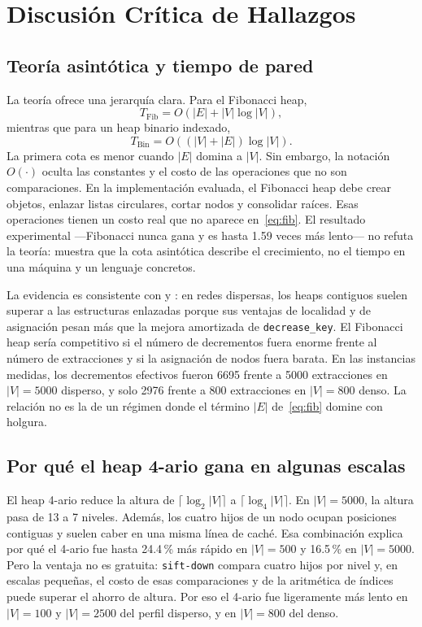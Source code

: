 \section{Discusión Crítica de Hallazgos}
\label{sec:discusion}

\subsection{Teoría asintótica y tiempo de pared}
La teoría ofrece una jerarquía clara. Para el Fibonacci heap,
\begin{equation}
    T_{\text{Fib}}=O(|E|+|V|\log|V|),
    \label{eq:fib}
\end{equation}
mientras que para un heap binario indexado,
\begin{equation}
    T_{\text{Bin}}=O((|V|+|E|)\log|V|).
    \label{eq:bin}
\end{equation}
La primera cota es menor cuando $|E|$ domina a $|V|$. Sin embargo, la notación $O(\cdot)$ oculta las constantes y el costo de las operaciones que no son comparaciones. En la implementación evaluada, el Fibonacci heap debe crear objetos, enlazar listas circulares, cortar nodos y consolidar raíces. Esas operaciones tienen un costo real que no aparece en~\eqref{eq:fib}. El resultado experimental —Fibonacci nunca gana y es hasta 1.59 veces más lento— no refuta la teoría: muestra que la cota asintótica describe el crecimiento, no el tiempo en una máquina y un lenguaje concretos.

La evidencia es consistente con \textcite{cherkassky1996shortest} y \textcite{lamarca1996cache}: en redes dispersas, los heaps contiguos suelen superar a las estructuras enlazadas porque sus ventajas de localidad y de asignación pesan más que la mejora amortizada de \texttt{decrease\_key}. El Fibonacci heap sería competitivo si el número de decrementos fuera enorme frente al número de extracciones y si la asignación de nodos fuera barata. En las instancias medidas, los decrementos efectivos fueron 6695 frente a 5000 extracciones en $|V|=5000$ disperso, y solo 2976 frente a 800 extracciones en $|V|=800$ denso. La relación no es la de un régimen donde el término $|E|$ de~\eqref{eq:fib} domine con holgura.

\subsection{Por qué el heap 4-ario gana en algunas escalas}
El heap 4-ario reduce la altura de $\lceil\log_2|V|\rceil$ a $\lceil\log_4|V|\rceil$. En $|V|=5000$, la altura pasa de 13 a 7 niveles. Además, los cuatro hijos de un nodo ocupan posiciones contiguas y suelen caber en una misma línea de caché. Esa combinación explica por qué el 4-ario fue hasta 24.4\,\% más rápido en $|V|=500$ y 16.5\,\% en $|V|=5000$. Pero la ventaja no es gratuita: \texttt{sift-down} compara cuatro hijos por nivel y, en escalas pequeñas, el costo de esas comparaciones y de la aritmética de índices puede superar el ahorro de altura. Por eso el 4-ario fue ligeramente más lento en $|V|=100$ y $|V|=2500$ del perfil disperso, y en $|V|=800$ del denso.

